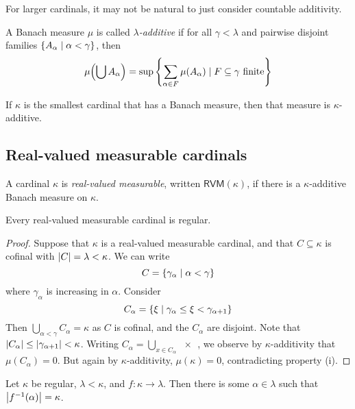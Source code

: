 For larger cardinals, it may not be natural to just consider countable additivity.
\begin{definition}
    A Banach measure \( \mu \) is called \emph{\( \lambda \)-additive} if for all \( \gamma < \lambda \) and pairwise disjoint families \( \qty{A_\alpha \mid \alpha < \gamma} \), then
    \[ \mu\qty(\bigcup A_\alpha) = \sup\qty{\sum_{\alpha \in F} \mu(A_\alpha) \mid F \subseteq \gamma \text{ finite}} \]
\end{definition}
\begin{theorem}
    If \( \kappa \) is the smallest cardinal that has a Banach measure, then that measure is \( \kappa \)-additive.
\end{theorem}

\subsection{Real-valued measurable cardinals}
\begin{definition}
    A cardinal \( \kappa \) is \emph{real-valued measurable}, written \( \mathsf{RVM}(\kappa) \), if there is a \( \kappa \)-additive Banach measure on \( \kappa \).
\end{definition}
\begin{proposition}
    Every real-valued measurable cardinal is regular.
\end{proposition}
\begin{proof}
    Suppose that \( \kappa \) is a real-valued measurable cardinal, and that \( C \subseteq \kappa \) is cofinal with \( \abs{C} = \lambda < \kappa \).
    We can write
    \[ C = \qty{\gamma_\alpha \mid \alpha < \gamma} \]
    where \( \gamma_\alpha \) is increasing in \( \alpha \).
    Consider
    \[ C_\alpha = \qty{\xi \mid \gamma_\alpha \leq \xi < \gamma_{\alpha + 1}} \]
    Then \( \bigcup_{\alpha < \gamma} C_\alpha = \kappa \) as \( C \) is cofinal, and the \( C_\alpha \) are disjoint.
    Note that \( \abs{C_\alpha} \leq \abs{\gamma_{\alpha + 1}} < \kappa \).
    Writing \( C_\alpha = \bigcup_{x \in C_\alpha} \qty{x} \), we observe by \( \kappa \)-additivity that \( \mu(C_\alpha) = 0 \).
    But again by \( \kappa \)-additivity, \( \mu(\kappa) = 0 \), contradicting property (i).
\end{proof}
\begin{proposition}
    Let \( \kappa \) be regular, \( \lambda < \kappa \), and \( f : \kappa \to \lambda \).
    Then there is some \( \alpha \in \lambda \) such that \( \abs{f^{-1}(\alpha)} = \kappa \).
\end{proposition}
